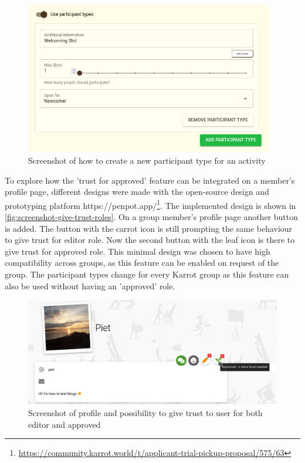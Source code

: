 \documentclass[
	a4paper,%
	11pt,%
	]{article}
\begin{document}
\begin{figure}[!h]
	\includegraphics[width=0.97\textwidth,
	]{images/screenshot_pick-ups_participant-type.png}
	\caption{Screenshot of how to create a new participant type for an activity}
	\label{fig:screenshot-create-role}
\end{figure}


To explore how the 'trust for approved' feature can be integrated on a member's profile page, different designs were made with the open-source design and prototyping platform https://penpot.app/\footnote{\label{url:penpot_designs}\url{https://community.karrot.world/t/applicant-trial-pickup-proposal/575/63}}. The implemented design is shown in \autoref{fig:screenshot-give-trust-roles}. On a group member's profile page another button is added. The button with the carrot icon is still prompting the same behaviour to give trust for editor role. Now the second button with the leaf icon is there to give trust for approved role. This minimal design was chosen to have high compatibility across groups, as this feature can be enabled on request of the group. The participant types change for every Karrot group as this feature can also be used without having an 'approved' role.

\begin{figure}[!ht]
	\includegraphics[width=\textwidth,
	]{images/screenshot_giving-trust-profile_approved.png}
	\caption{Screenshot of profile and possibility to give trust to user for both editor and approved}
	\label{fig:screenshot-give-trust-roles}
\end{figure}
\end{document}
